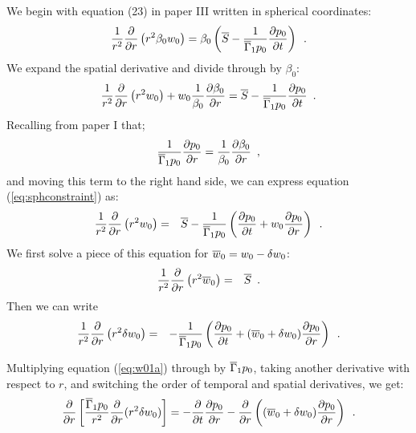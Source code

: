 We begin with equation (23) in paper III written in spherical coordinates:
\[
\frac{1}{r^2}\frac{\partial}{\partial r} \left (r^2 \beta_0 w_0 \right ) =
\beta_0 \left ( \overline{S} - \frac{1}{\overline{\Gamma}_1 p_0} \frac{\partial p_0}{\partial t} \right )\enskip.
\]
We expand the spatial derivative and divide through by $\beta_0$:
\begin{equation}
\label{eq:sphconstraint}
\frac{1}{r^2} \frac{\partial}{\partial r} \left (r^2 w_0 \right ) +
w_0 \frac{1}{\beta_0} \frac{\partial \beta_0}{\partial r} =
 \overline{S} - \frac{1}{\overline{\Gamma}_1 p_0} \frac{\partial p_0}{\partial t}  \enskip .
\end{equation}
Recalling from paper I that;
\[
\frac{1}{\overline{\Gamma}_1 p_0}  \frac{\partial p_0}{\partial r} = \frac{1}{\beta_0} \frac{\partial \beta_0}{\partial r}\enskip,
\]
and moving this term to the right hand side,
we can express equation (\ref{eq:sphconstraint}) as:
\begin{eqnarray}
\frac{1}{r^2} \frac{\partial}{\partial r} \left (r^2 w_0 \right ) &=&
  \overline{S} - \frac{1}{\overline{\Gamma}_1 p_0} \left( 
\frac{\partial p_0}{\partial t} + w_0 \frac{\partial p_0}{\partial r} \right)\enskip. \label{eq:w01}
\end{eqnarray}
We first solve a piece of this equation for $\overline{w}_0 = w_0 - \delta w_0$:
\begin{eqnarray}
\frac{1}{r^2} \frac{\partial}{\partial r} \left (r^2 \overline{w}_0 \right ) &=& \overline{S} \enskip.
\end{eqnarray}
Then we can write
\begin{eqnarray}
\frac{1}{r^2} \frac{\partial}{\partial r} \left (r^2 \delta w_0 \right ) &=&
  - \frac{1}{\overline{\Gamma}_1 p_0} \left(
\frac{\partial p_0}{\partial t} + (\overline{w}_0 + \delta w_0)
\frac{\partial p_0}{\partial r} \right)\enskip.\label{eq:w01a}
\end{eqnarray}

Multiplying equation (\ref{eq:w01a}) through by $\overline{\Gamma}_1 p_0 $,
taking another derivative with respect to $r$, and switching the order
of temporal and spatial derivatives, we get:
\begin{equation}
\label{eq:sphconstraint_2}
\frac{\partial}{\partial r} \left [ \frac{\overline{\Gamma}_1 p_0 }{r^2} \frac{\partial}{\partial r} (r^2 \delta w_0) \right ]
= -\frac{\partial}{\partial t} \frac{\partial p_0}{\partial r}
  -\frac{\partial}{\partial r} \left ((\overline{w}_0+\delta w_0) \frac{\partial p_0}{\partial r} \right )\enskip.
\end{equation}

